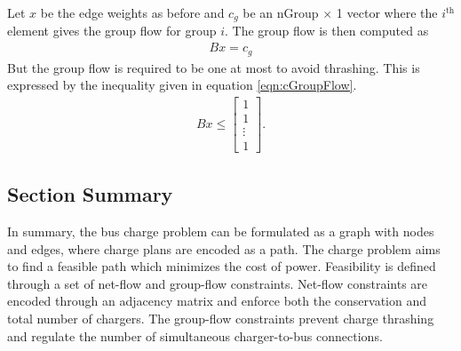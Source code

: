 Let $x$ be the edge weights as before and $c_g$ be an nGroup $\times$ 1 vector where the $i^{\text{th}}$ element gives the group flow for group $i$. The group flow is then computed as 
\begin{align}
	Bx = c_g
\end{align}
But the group flow is required to be one at most to avoid thrashing.  This is expressed by the inequality given in equation \ref{eqn:cGroupFlow}.
\begin{align}\label{eqn:cGroupFlow}
	Bx \le \begin{bmatrix} 1\\ 1 \\\vdots \\ 1\end{bmatrix}.
\end{align}
\subsection{Section Summary} In summary, the bus charge problem can be formulated as a graph with nodes and edges, where charge plans are encoded as a path. The charge problem aims to find a feasible path which minimizes the cost of power. Feasibility is defined through a set of net-flow and group-flow constraints. Net-flow constraints are encoded through an adjacency matrix and enforce both the conservation and total number of chargers. The group-flow constraints prevent charge thrashing and regulate the number of simultaneous charger-to-bus connections. 
